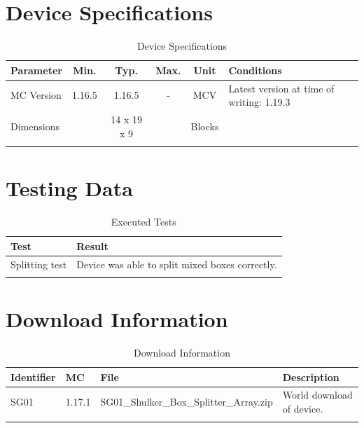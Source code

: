 \documentclass[10pt]{datasheet}
\begin{document}
\onecolumn

\section{Device Specifications}

\begin{table}[h]
    \caption{Device Specifications}
    \begin{tabularx}{\textwidth}{l | c c c | c | X}
        \thickhline
        \textbf{Parameter} & \textbf{Min.} & \textbf{Typ.} & \textbf{Max.} &
        \textbf{Unit} & \textbf{Conditions} \\
        \hline
        MC Version & 1.16.5 & 1.16.5 & - & MCV & Latest version at time of writing: 1.19.3\\
        \hline
        Dimensions & & 14 x 19 x 9 & & Blocks & \\
        \thickhline
\end{tabularx}
\end{table}
\newpage
\section{Testing Data}
\begin{table}[h]
\caption{Executed Tests}
\begin{tabularx}{\textwidth}{l | X}
    \thickhline
    \textbf{Test} & \textbf{Result} \\
    \hline
    Splitting test & Device was able to split mixed boxes correctly. \\
    \thickhline
\end{tabularx}
\end{table}

\section{Download Information}
\begin{table}[h]
    \caption{Download Information}
    \begin{tabularx}{\textwidth}{l | l | l | X}
        \thickhline
        \textbf{Identifier} & \textbf{MC} & \textbf{File} & \textbf{Description} \\
        \hline
        SG01 & 1.17.1 & SG01\_Shulker\_Box\_Splitter\_Array.zip & World download of device. \\
        \hline
        \thickhline
    \end{tabularx}
\end{table}
\end{document}
